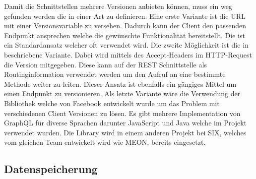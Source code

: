 Damit die Schnittstellen mehrere Versionen anbieten können, muss ein weg gefunden werden die in einer Art zu definieren. \newline Eine erste Variante ist die URL mit einer Versionsvariable zu versehen. Dadurch kann der Client den passenden Endpunkt ansprechen welche die gewünschte Funktionalität bereitstellt. Die ist ein Standardansatz welcher oft verwendet wird.\newline
Die zweite Möglichkeit ist die in \cite{contneg} beschriebene Variante. Dabei wird mittels des Accept-Headers im HTTP-Request die Version mitgegeben. Diese kann auf der REST Schnittstelle als Routinginformation verwendet werden um den Aufruf an eine bestimmte Methode weiter zu leiten. Dieser Ansatz ist ebenfalls ein gängiges Mittel um einen Endpunkt zu versionieren.\newline
Als letzte Variante wäre die Verwendung der \cite{gq} Bibliothek welche von Facebook entwickelt wurde um das Problem mit verschiedenen Client Versionen zu lösen. Es gibt mehrere Implementation von GraphQL für diverse Sprachen darunter JavaScript und Java welche im Projekt verwendet wurden. Die Library wird in einem anderen Projekt bei SIX, welches vom gleichen Team entwickelt wird wie MEON, bereits eingesetzt.

\subsection{Datenspeicherung}

